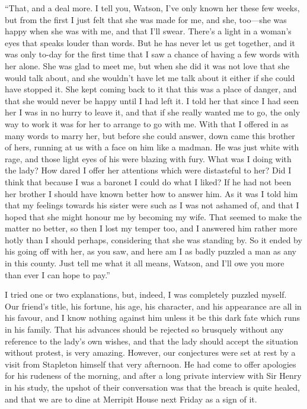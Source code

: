 \documentclass[paper=5.5in:8.5in,BCOR=7mm,twoside,DIV=calc,12pt,usegeometry,openany,chapterprefix,endperiod]{scrbook} %
\begin{document}
\enquote{That, and a deal more. I tell you, Watson, I've only known her these few weeks, but from the first I just felt that she was made for me, and she, too\nobreakdash---she was happy when she was with me, and that I'll swear. There's a light in a woman's eyes that speaks louder than words. But he has never let us get together, and it was only to-day for the first time that I saw a chance of having a few words with her alone. She was glad to meet me, but when she did it was not love that she would talk about, and she wouldn't have let me talk about it either if she could have stopped it. She kept coming back to it that this was a place of danger, and that she would never be happy until I had left it. I told her that since I had seen her I was in no hurry to leave it, and that if she really wanted me to go, the only way to work it was for her to arrange to go with me. With that I offered in as many words to marry her, but before she could answer, down came this brother of hers, running at us with a face on him like a madman. He was just white with rage, and those light eyes of his were blazing with fury. What was I doing with the lady? How dared I offer her attentions which were distasteful to her? Did I think that because I was a baronet I could do what I liked? If he had not been her brother I should have known better how to answer him. As it was I told him that my feelings towards his sister were such as I was not ashamed of, and that I hoped that she might honour me by becoming my wife. That seemed to make the matter no better, so then I lost my temper too, and I answered him rather more hotly than I should perhaps, considering that she was standing by. So it ended by his going off with her, as you saw, and here am I as badly puzzled a man as any in this county. Just tell me what it all means, Watson, and I'll owe you more than ever I can hope to pay.}

I tried one or two explanations, but, indeed, I was completely puzzled myself. Our friend's title, his fortune, his age, his character, and his appearance are all in his favour, and I know nothing against him unless it be this dark fate which runs in his family. That his advances should be rejected so brusquely without any reference to the lady's own wishes, and that the lady should accept the situation without protest, is very amazing. However, our conjectures were set at rest by a visit from Stapleton himself that very afternoon. He had come to offer apologies for his rudeness of the morning, and after a long private interview with Sir Henry in his study, the upshot of their conversation was that the breach is quite healed, and that we are to dine at Merripit House next Friday as a sign of it.
\end{document}
